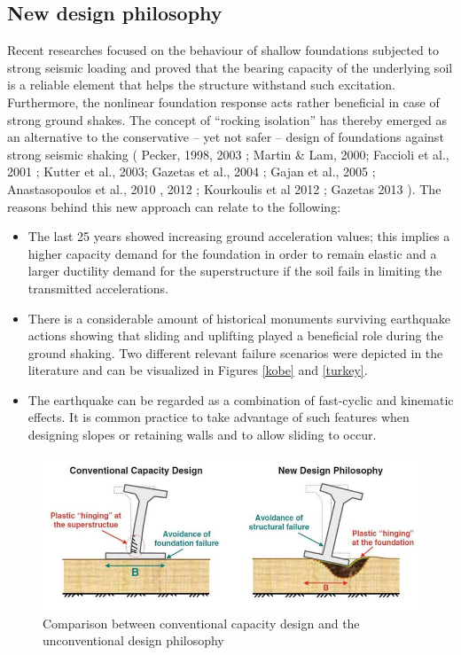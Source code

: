 \documentclass[11pt,a4paper]{report}
\begin{document}
\subsection{New design philosophy}
Recent researches focused on the behaviour of shallow foundations subjected to strong seismic loading and proved that the bearing capacity of the underlying soil is a reliable element that helps the structure withstand such excitation. Furthermore, the nonlinear foundation response acts rather beneficial in case of strong ground shakes. The concept of “rocking isolation” has thereby emerged as an alternative to the conservative – yet not safer – design of foundations against strong seismic shaking ( Pecker, 1998, 2003 \cite{pecker2014role}; Martin \& Lam, 2000; Faccioli et al., 2001 \cite{faccioli2001investigation}; Kutter et al., 2003; Gazetas et al., 2004 \cite{gazetas2004seismic}; Gajan et al., 2005 \cite{gajan2005centrifuge}; Anastasopoulos et al., 2010 \cite{anastasopoulos2010soil}, 2012 \cite{anastasopoulos2011simplified}; Kourkoulis et al 2012 \cite{kourkoulis2012rocking}; Gazetas 2013 \cite{gazetas2013nonlinear}). The reasons behind this new approach can relate to the following:

\begin{itemize}
	\item The last 25 years showed increasing ground acceleration values; this implies a higher capacity demand for the foundation in order to remain elastic and a larger ductility demand for the superstructure if the soil fails in limiting the transmitted accelerations.
	\item There is a considerable amount of historical monuments surviving earthquake actions showing that sliding and uplifting played a beneficial role during the ground shaking. Two different relevant failure scenarios were depicted in the literature and can be visualized in Figures \ref{kobe} and \ref{turkey}.
	\item The earthquake can be regarded as a combination of fast-cyclic and kinematic effects. It is common practice to take advantage of such features when designing slopes or retaining walls and to allow sliding to occur.
\end{itemize}

\begin{figure}[h!]
	\centering
	\includegraphics[width=0.9\linewidth]{"new_phil"}
	\caption{Comparison between conventional capacity design and the unconventional design philosophy}
	\label{comp}
\end{figure}
\end{document}
